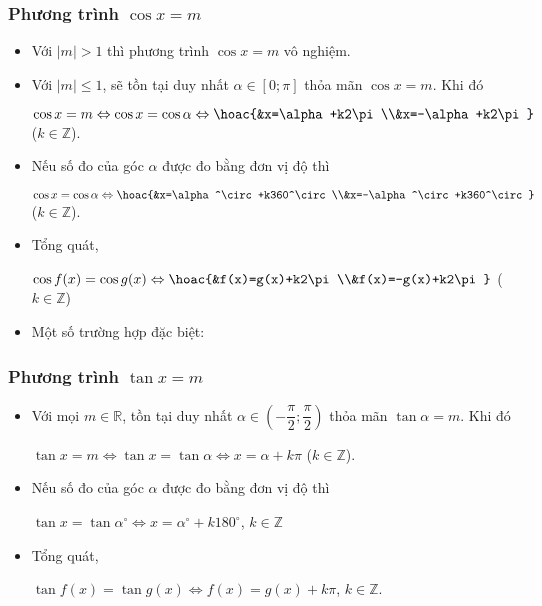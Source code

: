 \begin{tomtat}
	\subsubsection{Phương trình $\cos x=m$}
\begin{itemize}
	\item Với $|m|>1$ thì phương trình $\cos x=m$ vô nghiệm.
	\item Với $|m|\leq 1$, sẽ tồn tại duy nhất $\alpha\in\left[0; \pi\right]$ thỏa mãn $\cos x=m$. Khi đó
	\begin{center}
		$\cos x=m\Leftrightarrow\cos x=\cos \alpha\Leftrightarrow\hoac{&x=\alpha+k2\pi\\&x=-\alpha+k2\pi}$ ($k\in\mathbb{Z}$).
	\end{center}
\item Nếu số đo của góc $\alpha$ được đo bằng đơn vị độ thì
\begin{center}
	$\cos x=\cos\alpha\Leftrightarrow\hoac{&x=\alpha^\circ+k360^\circ\\&x=-\alpha^\circ+k360^\circ}$ ($k\in\mathbb{Z}$).
\end{center}
\item Tổng quát,
\begin{center}
	$\cos f(x)=\cos g(x)\Leftrightarrow\hoac{&f(x)=g(x)+k2\pi\\&f(x)=-g(x)+k2\pi}$ ($k\in \mathbb{Z}$)
\end{center}
\item Một số trường hợp đặc biệt:
\end{itemize}
\subsubsection{Phương trình $\tan x=m$}
\begin{itemize}
	\item Với mọi $m\in\mathbb{R}$, tồn tại duy nhất $\alpha\in\left(-\dfrac{\pi}{2};\dfrac{\pi}{2}\right)$ thỏa mãn $\tan \alpha=m$. Khi đó
	\begin{center}
		$\tan x=m\Leftrightarrow\tan x=\tan \alpha\Leftrightarrow x=\alpha+k\pi$ ($k\in\mathbb{Z}$).
	\end{center}
\item Nếu số đo của góc $\alpha$ được đo bằng đơn vị độ thì
\begin{center}
	$\tan x=\tan\alpha^\circ\Leftrightarrow x=\alpha^\circ+k180^\circ$, $k\in \mathbb{Z}$
\end{center}
\item Tổng quát,
\begin{center}
	$\tan f(x)=\tan g(x)\Leftrightarrow f(x)=g(x)+k\pi$, $k\in\mathbb{Z}$.
\end{center}
\end{itemize}

\end{tomtat}
